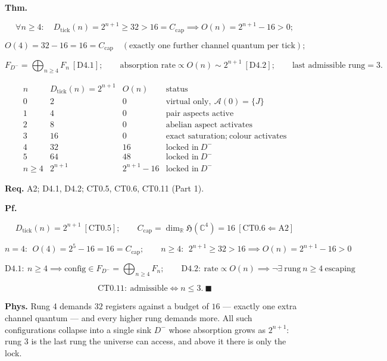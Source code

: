 \begin{theorem}\label{tag:CT4-1}
\textbf{Thm.}

\[
\forall n\ge4:\quad D_{\mathrm{tick}}(n)=2^{n+1}\ge32>16=C_{\mathrm{cap}}\implies O(n)=2^{n+1}-16>0;
\]

\[
O(4)=32-16=16=C_{\mathrm{cap}}\quad(\text{exactly one further channel quantum per tick});
\]

\[
F_{D^-}=\bigoplus_{n\ge4}F_n\ [\mathrm{D4.1}];\qquad
\text{absorption rate}\propto O(n)\sim2^{n+1}\ [\mathrm{D4.2}];\qquad
\text{last admissible rung}=3 .
\]

\[
\begin{array}{c|c|c|c}
n & D_{\mathrm{tick}}(n)=2^{n+1} & O(n) & \text{status}\\ \hline
0 & 2 & 0 & \text{virtual only},\ \mathcal A(0)=\{J\}\\
1 & 4 & 0 & \text{pair aspects active}\\
2 & 8 & 0 & \text{abelian aspect activates}\\
3 & 16 & 0 & \text{exact saturation};\ \text{colour activates}\\
4 & 32 & 16 & \text{locked in}\ D^-\\
5 & 64 & 48 & \text{locked in}\ D^-\\
n\ge4 & 2^{n+1} & 2^{n+1}-16 & \text{locked in}\ D^-
\end{array}
\]

\textbf{Req.} A2; D4.1, D4.2; CT0.5, CT0.6, CT0.11 (Part 1).

\textbf{Pf.}

\[
D_{\mathrm{tick}}(n)=2^{n+1}\ [\mathrm{CT0.5}];\qquad C_{\mathrm{cap}}=\dim_{\mathbb R}\mathfrak H(\mathbb C^4)=16\ [\mathrm{CT0.6}\Leftarrow\mathrm{A2}]
\]

\[
n=4:\ \ O(4)=2^{5}-16=16=C_{\mathrm{cap}};\qquad
n\ge4:\ \ 2^{n+1}\ge32>16\implies O(n)=2^{n+1}-16>0
\]

\[
\mathrm{D4.1}:\ n\ge4\implies\text{config}\in F_{D^-}=\bigoplus_{n\ge4}F_n;\qquad
\mathrm{D4.2}:\ \text{rate}\propto O(n)\implies\neg\exists\ \text{rung}\ n\ge4\ \text{escaping}
\]

\[
\mathrm{CT0.11}:\ \text{admissible}\iff n\le3.\ \blacksquare
\]

\textbf{Phys.} Rung 4 demands $32$ registers against a budget of $16$ — exactly one extra channel quantum — and every higher rung demands more. All such configurations collapse into a single sink $D^-$ whose absorption grows as $2^{n+1}$: rung 3 is the last rung the universe can access, and above it there is only the lock.

\end{theorem}

